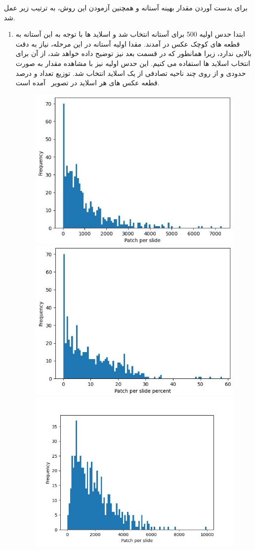 برای بدست آوردن مقدار بهینه آستانه و همچنین آزمودن این روش، به ترتیب زیر عمل شد.
\begin{enumerate}
    \item ابتدا حدس اولیه 500 برای آستانه انتخاب شد و اسلاید ها با توجه به این آستانه به قطعه های کوچک عکس در آمدند.
    مقدا اولیه آستانه در این مرحله، نیاز به دقت بالایی ندارد، زیرا همانطور که در قسمت بعد نیز توضیح داده خواهد شد، از آن برای انتخاب اسلاید ها استفاده می کنیم.
    این حدس اولیه نیز با مشاهده مقدار به صورت حدودی و از روی چند ناحیه تصادفی از یک اسلاید انتخاب شد.
    توزیع تعداد و درصد قطعه عکس های هر اسلاید در تصویر~ آمده است.
    \begin{figure}
        \begin{center}
            \includegraphics[width=0.48\linewidth]{figs/introduction/subs/challenges/patch_distribution_old_500_threshold.jpeg}
            \includegraphics[width=0.48\linewidth]{figs/introduction/subs/challenges/patch_percent_distribution_old_threshold_500.jpeg}
            \hspace{.2cm}
            \includegraphics[width=0.48\linewidth]{figs/introduction/subs/challenges/patch_distribution_new_298_threshold.jpeg}

\end{center}
\end{figure}
\end{enumerate}

